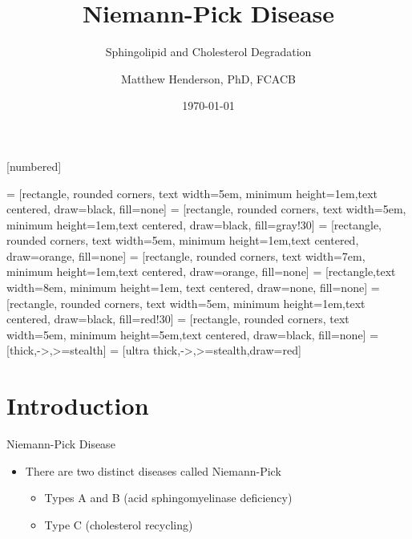 \documentclass[presentation, smaller]{beamer}
\author{Matthew Henderson, PhD, FCACB}
\date{\today}
\title{Niemann-Pick Disease}
\subtitle{Sphingolipid and Cholesterol Degradation}
\institute[NSO]{Newborn Screening Ontario | The University of Ottawa}
\begin{document}
\maketitle

\vspace{220pt}
\beamertemplatenavigationsymbolsempty
{}[numbered]

 = [rectangle, rounded corners, text width=5em, minimum height=1em,text centered, draw=black, fill=none]
 = [rectangle, rounded corners, text width=5em, minimum height=1em,text centered, draw=black, fill=gray!30]
 = [rectangle, rounded corners, text width=5em, minimum height=1em,text centered, draw=orange, fill=none]
 = [rectangle, rounded corners, text width=7em, minimum height=1em,text centered, draw=orange, fill=none]
 = [rectangle,text width=8em, minimum height=1em, text centered, draw=none, fill=none]
 = [rectangle, rounded corners, text width=5em, minimum height=1em,text centered, draw=black, fill=red!30]
 = [rectangle, rounded corners, text width=5em, minimum height=5em,text centered, draw=black, fill=none]
 = [thick,->,>=stealth]
 = [ultra thick,->,>=stealth,draw=red]

\section{Introduction}
\label{sec:orgheadline10}

\begin{frame}[label={sec:orgheadline1}]{Niemann-Pick Disease}
\begin{itemize}
\item There are two distinct diseases called Niemann-Pick
\begin{itemize}
\item Types A and B (acid sphingomyelinase deficiency)
\item Type C (cholesterol recycling)
\end{itemize}
\end{itemize}
\end{frame}
\end{document}
